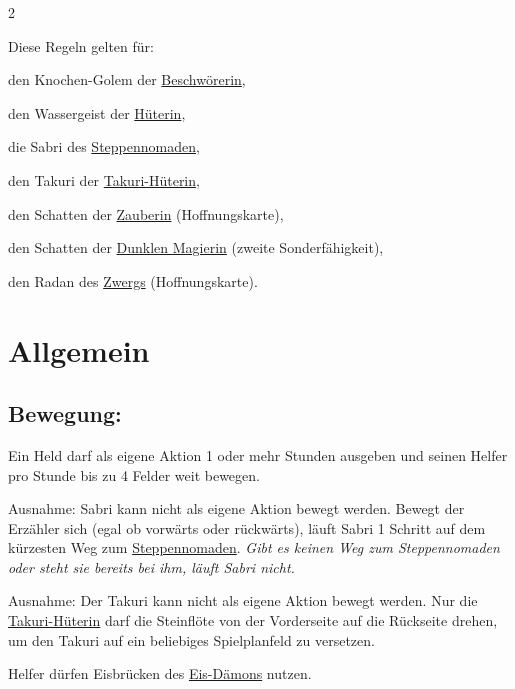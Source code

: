 \documentclass[10pt, a4paper, oneside]{book}
\newcommand{\fan}[1]{\textit{#1}}
\begin{document}
\begin{multicols*}{2}\raggedcolumns


\begin{nobgcolor}

Diese Regeln gelten für:

\bullet{} den Knochen-Golem der \hyperref[Beschwörerin]{Beschwörerin},

\bullet{} den Wassergeist der \hyperref[Hüterin]{Hüterin},

\bullet{} die Sabri des \hyperref[Steppennomade]{Steppennomaden},

\bullet{} den Takuri der \hyperref[Takuri-Hüterin]{Takuri-Hüterin},

\bullet{} den Schatten der \hyperref[Zauberin]{Zauberin} (Hoffnungskarte),

\bullet{} den Schatten der \hyperref[Dunkle Magierin]{Dunklen Magierin} (zweite Sonderfähigkeit),

\bullet{} den Radan des \hyperref[Zwerg]{Zwergs} (Hoffnungskarte).





\section{Allgemein}




\subsection{Bewegung:}


Ein Held darf als eigene Aktion 1 oder mehr Stunden ausgeben und seinen Helfer pro Stunde bis zu 4 Felder weit bewegen.\supercite{NH:Begleitheft,DlH17:Hoffnungskarte_Zwerg,Dunkle_Eara:Regelkarte}

Ausnahme: Sabri kann nicht als eigene Aktion bewegt werden. Bewegt der Erzähler sich (egal ob vorwärts oder rückwärts), läuft Sabri 1 Schritt auf dem kürzesten Weg zum \hyperref[Steppennomade]{Steppennomaden}. \fan{Gibt es keinen Weg zum Steppennomaden oder steht sie bereits bei ihm, läuft Sabri nicht.}

Ausnahme: Der Takuri kann nicht als eigene Aktion bewegt werden. Nur die \hyperref[Takuri-Hüterin]{Takuri-Hüterin} darf die Steinflöte von der Vorderseite auf die Rückseite drehen, um den Takuri auf ein beliebiges Spielplanfeld zu versetzen.

Helfer dürfen Eisbrücken des \hyperref[Eis-Dämon]{Eis-Dämons} nutzen.
\supercite{88780}


\end{nobgcolor}
\end{multicols*}
\end{document}
